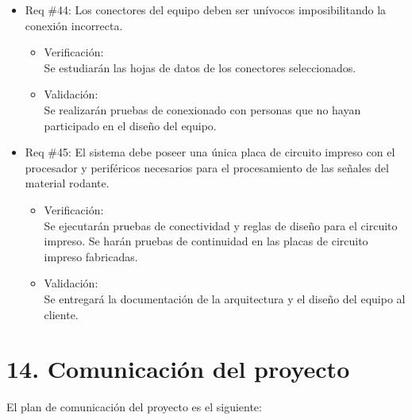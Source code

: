 \documentclass[11pt]{charter}
\begin{document}
\begin{itemize}
\item Req \#44: Los conectores del equipo deben ser unívocos imposibilitando la conexión incorrecta.
\begin{itemize}
  \item Verificación:\\
  Se estudiarán las hojas de datos de los conectores seleccionados.
  \item Validación:\\
  Se realizarán pruebas de conexionado con personas que no hayan participado en el diseño del equipo.
\end{itemize}

\item Req \#45: El sistema debe poseer una única placa de circuito impreso con el procesador y periféricos necesarios para el procesamiento de las señales del material rodante.
\begin{itemize}
  \item Verificación:\\
  Se ejecutarán pruebas de conectividad y reglas de diseño para el circuito impreso.
  Se harán pruebas de continuidad en las placas de circuito impreso fabricadas.
  \item Validación:\\
  Se entregará la documentación de la arquitectura y el diseño del equipo al cliente.
\end{itemize}

\end{itemize}

\newpage

\section{14. Comunicación del proyecto}
\label{sec:comunicaciones}

El plan de comunicación del proyecto es el siguiente:
\end{document}
